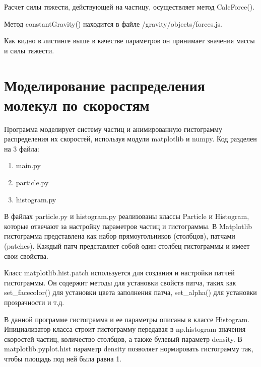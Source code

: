\noindent Расчет силы тяжести, действующей на частицу, осуществляет метод CalcForce().


\noindent Метод constantGravity() находится в файле /gravity/objects/forces.js.

\noindent Как видно в листинге выше в качестве параметров он принимает значения массы и силы тяжести.

\newpage
\section{Моделирование распределения молекул по скоростям}

Программа моделирует систему частиц и анимированную гистограмму распределения их скоростей, используя модули matplotlib и numpy. Код разделен на 3 файла:

\begin{enumerate}
    \item main.py
    \item particle.py
    \item histogram.py
\end{enumerate}

В файлах particle.py и histogram.py реализованы классы Particle и Histogram, которые отвечают за настройку параметров частиц и гистограммы. В Matplotlib гистограмма представлена как набор прямоугольников (столбцов), патчами (patches). Каждый патч представляет собой один столбец гистограммы и имеет свои свойства.

Класс matplotlib.hist.patch используется для создания и настройки патчей гистограммы. Он содержит методы для установки свойств патча, таких как set\_facecolor() для установки цвета заполнения патча, set\_alpha() для установки прозрачности и т.д.

В данной программе гистограмма и ее параметры описаны в классе Histogram. Инициализатор класса строит гистограмму передавая в  np.histogram значения скоростей частиц, количество столбцов,  а также булевый параметр density. В matplotlib.pyplot.hist параметр
density позволяет нормировать гистограмму так, чтобы площадь под ней была равна 1.

